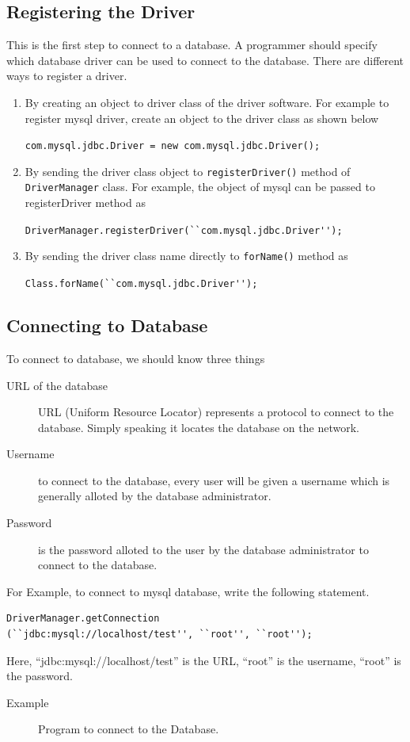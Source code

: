 \documentclass[11pt,a4paper]{article}
\begin{document}
\subsection*{Registering the Driver}
This is the first step to connect to a database. A programmer should specify which database driver can be used to connect to the database. There are different ways to register a driver.
\begin{enumerate}
    \item By creating an object to driver class of the driver software. For example to register mysql driver, create an object to the driver class as shown below

\lstinline!com.mysql.jdbc.Driver = new com.mysql.jdbc.Driver();!
 \item By sending the driver class object to \texttt{registerDriver()} method of \texttt{DriverManager} class. For example, the object of mysql can be passed to registerDriver method as

\lstinline!DriverManager.registerDriver(``com.mysql.jdbc.Driver'');!
 \item By sending the driver class name directly to \texttt{forName()} method as

 \lstinline!Class.forName(``com.mysql.jdbc.Driver'');!
\end{enumerate}
 \subsection*{Connecting to Database}
 To connect to database, we should know three things
 \begin{description}
\item[URL of the database] URL (Uniform Resource Locator) represents a protocol to connect to the database. Simply speaking it locates the database on the network.
\item[Username] to connect to the database, every user will be given a username which is generally alloted by the database administrator.
\item[Password] is the password alloted to the user by the database administrator to connect to the database.
\end{description}
For Example, to connect to mysql database, write the following statement.
\begin{lstlisting}[numbers=none]
DriverManager.getConnection
(``jdbc:mysql://localhost/test'', ``root'', ``root'');
\end{lstlisting}
Here, ``jdbc:mysql://localhost/test'' is the URL, ``root'' is the username, ``root'' is the password.
\begin{description}
\item[Example] Program to connect to the Database.

\end{description}
\end{document}
